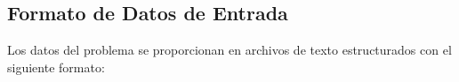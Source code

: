 \documentclass[a4paper,12pt]{article}
\begin{document}




\subsection*{Formato de Datos de Entrada}

Los datos del problema se proporcionan en archivos de texto estructurados con el siguiente formato:

\end{document}
